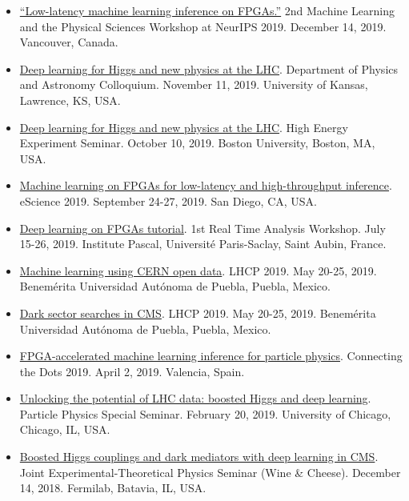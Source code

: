 \documentclass[11pt]{res}
\begin{document}
\begin{resume}
\begin{itemize}
    \item \href{https://ml4physicalsciences.github.io/2019/files/NeurIPS_ML4PS_2019_74.pdf}{``Low-latency machine learning inference on FPGAs.''} 2nd Machine Learning and the Physical Sciences Workshop at NeurIPS 2019.  December 14, 2019. Vancouver, Canada.
    \item \href{https://physics.drupal.ku.edu/calendar/colloquia#/?i=2}{Deep learning for Higgs and new physics at the LHC}. Department of Physics and Astronomy Colloquium. November 11, 2019. University of Kansas, Lawrence, KS, USA.
    \item \href{http://physics.bu.edu/events/show/2204}{Deep learning for Higgs and new physics at the LHC}. High Energy Experiment Seminar. October 10, 2019. Boston University, Boston, MA, USA.
    \item \href{https://escience2019.sdsc.edu/program}{Machine learning on FPGAs for low-latency and high-throughput inference}. eScience 2019. September 24-27, 2019. San Diego, CA, USA.
    \item \href{https://indico.cern.ch/event/793125/contributions/3495251/}{Deep learning on FPGAs tutorial}. 1st Real Time Analysis Workshop. July 15-26, 2019. Institute Pascal, Universit\'{e} Paris-Saclay, Saint Aubin, France.
    \item \href{https://indico.cern.ch/event/687651/contributions/3428206/}{Machine learning using CERN open data}. LHCP 2019. May 20-25, 2019. Benem\'{e}rita Universidad Aut\'{o}noma de Puebla, Puebla, Mexico.
    \item \href{https://indico.cern.ch/event/687651/contributions/3426898/}{Dark sector searches in CMS}. LHCP 2019. May 20-25, 2019. Benem\'{e}rita Universidad Aut\'{o}noma de Puebla, Puebla, Mexico.
    \item \href{https://indico.cern.ch/event/742793/contributions/3274392/}{FPGA-accelerated machine learning inference for particle physics}. Connecting the Dots 2019. April 2, 2019. Valencia, Spain.
    \item \href{https://universityofchicago.hosted.panopto.com/Panopto/Pages/Viewer.aspx?id=66ca09d7-74c1-4b12-bb57-a9fa01046cdf}{Unlocking the potential of LHC data: boosted Higgs and deep learning}. Particle Physics Special Seminar. February 20, 2019. University of Chicago, Chicago, IL, USA.
    \item \href{http://theory.fnal.gov/events/event/results-from-cms-18/}{Boosted Higgs couplings and dark mediators with deep learning in CMS}. Joint Experimental-Theoretical Physics Seminar (Wine \& Cheese). December 14, 2018. Fermilab, Batavia, IL, USA.

\end{itemize}
\end{resume}
\end{document}
